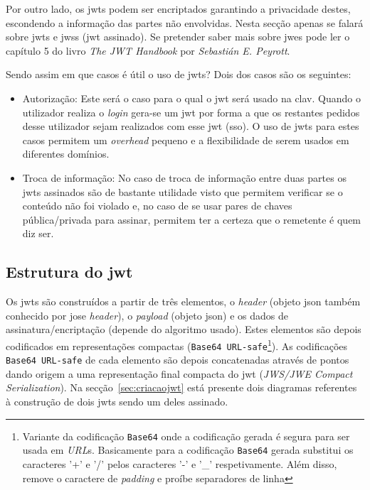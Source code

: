 Por outro lado, os \acrshort{jwt}s podem ser encriptados garantindo a privacidade destes, escondendo a informação das partes não envolvidas. Nesta secção apenas se falará sobre \acrshort{jwt}s e \acrshort{jws}s (\acrshort{jwt} assinado). Se pretender saber mais sobre \acrshort{jwe}s pode ler o capítulo 5 do livro \textit{The JWT Handbook} por \textit{Sebastián E. Peyrott}.

Sendo assim em que casos é útil o uso de \acrshort{jwt}s? Dois dos casos são os seguintes:
\begin{itemize}
    \item Autorização: Este será o caso para o qual o \acrshort{jwt} será usado na \acrshort{clav}. Quando o utilizador realiza o \textit{login} gera-se um \acrshort{jwt} por forma a que os restantes pedidos desse utilizador sejam realizados com esse \acrshort{jwt} (\acrlong{sso}). O uso de \acrshort{jwt}s para estes casos permitem um \textit{overhead} pequeno e a flexibilidade de serem usados em diferentes domínios.
    \item Troca de informação: No caso de troca de informação entre duas partes os \acrshort{jwt}s assinados são de bastante utilidade visto que permitem verificar se o conteúdo não foi violado e, no caso de se usar pares de chaves pública/privada para assinar, permitem ter a certeza que o remetente é quem diz ser.
\end{itemize}

\subsection{Estrutura do \acrshort{jwt}}

Os \acrshort{jwt}s são construídos a partir de três elementos, o \textit{header} (objeto \acrshort{json} também conhecido por \acrshort{jose} \textit{header}), o \textit{payload} (objeto \acrshort{json}) e os dados de assinatura/encriptação (depende do algoritmo usado). Estes elementos são depois codificados em representações compactas (\texttt{Base64 URL-safe}\footnote{Variante da codificação \texttt{Base64} onde a codificação gerada é segura para ser usada em \textit{URL}s. Basicamente para a codificação \texttt{Base64} gerada substitui os caracteres '+' e '/' pelos caracteres '-' e '\_' respetivamente. Além disso, remove o caractere de \textit{padding} e proíbe separadores de linha}). As codificações \texttt{Base64 URL-safe} de cada elemento são depois concatenadas através de pontos dando origem a uma representação final compacta do \acrshort{jwt} (\textit{JWS/JWE Compact Serialization}). Na secção~\ref{sec:criacaojwt} está presente dois diagramas referentes à construção de dois \acrshort{jwt}s sendo um deles assinado.

